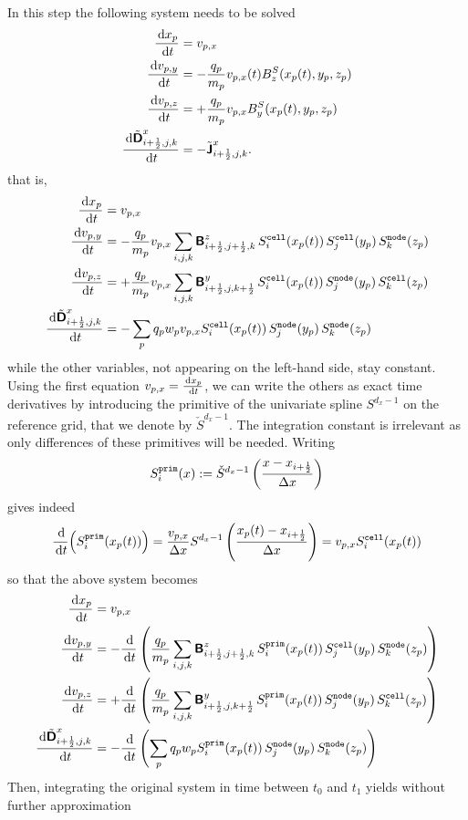 \documentclass[11pt]{article}
\newcommand{\cell}{\texttt{cell}}
\newcommand{\node}{\texttt{node}}
\newcommand{\prim}{\texttt{prim}}
\begin{document}
In this step the following system needs to be solved
$$
\begin{aligned}
    \fract{x_p}{t} &= v_{p,x} \\
    \fract{v_{p, y}}{t} &= - \frac{q_p}{m_p} v_{p,x}(t)B^S_z(x_p(t) ,y_p,z_p) \\
    \fract{v_{p, z}}{t} &= + \frac{q_p}{m_p} v_{p,x}B^S_y(x_p(t),y_p,z_p) \\
    \fract{\tilde{\arrD}^{x}_{\iph,j,k}}{t} &= -\tilde{\arrJ}^{x}_{\iph,j,k}. %
\end{aligned}
$$
that is,
$$
\begin{aligned}
    \fract{x_p}{t} &= v_{p,x} \\
    \fract{v_{p, y}}{t} &= -\frac{q_p}{m_p} v_{p,x} \sum_{i,j,k} \arrB^{z}_{\iph,\jph,k} \,S^\cell_i(x_p(t))\,S^\cell_j(y_p) \, S^\node_k(z_p)\\
    \fract{v_{p, z}}{t} &= +\frac{q_p}{m_p} v_{p,x} \sum_{i,j,k} \arrB^{y}_{\iph,j,\kph} \,S^\cell_i(x_p(t))\,S^\node_j(y_p) \, S^\cell_k(z_p) \\
    \fract{\tilde{\arrD}^{x}_{\iph,j,k}}{t} &= - \sum_p q_p w_p v_{p,x} S^\cell_i(x_p(t))\, S^\node_j(y_p) \,S^\node_k(z_p)    
\end{aligned}
$$
while the other variables, not appearing on the left-hand side, stay constant.
Using the first equation $v_{p,x}=\frac{\, {\rm d} x_p}{\, {\rm d} t}$, we can write the others as exact time derivatives 
by introducing the primitive of the univariate spline $S^{d_x-1}$ on the reference grid,
that we denote by $\check{S}^{d_x-1}$.
The integration constant is irrelevant as only differences of these primitives will be needed.
Writing
$$
S^\prim_i(x) := \check{S}^{d_x-1}\left(\frac{x-x_\iph}{\Delta x}\right)
$$
gives indeed
$$
\fract{}{t} \Big(S^\prim_i(x_p(t))\Big)
= \frac{v_{p,x}}{\Delta x} S^{d_x-1}\left(\frac{x_p(t)-x_\iph}{\Delta x}\right)
= v_{p,x} S^\cell_i(x_p(t))
$$ 
so that the above system becomes
$$
\begin{aligned}
    \fract{x_p}{t} &= v_{p,x} \\
    \fract{v_{p, y}}{t} &= -\fract{}{t} \left(\frac{q_p}{m_p} \sum_{i,j,k} \arrB^{z}_{\iph,\jph,k} \,S^\prim_i(x_p(t))\,S^\cell_j(y_p) \, S^\node_k(z_p)\right)\\
    \fract{v_{p, z}}{t} &= +\fract{}{t} \left(\frac{q_p}{m_p} \sum_{i,j,k} \arrB^{y}_{\iph,j,\kph} \,S^\prim_i(x_p(t))\,S^\node_j(y_p) \, S^\cell_k(z_p) \right)\\
    \fract{\tilde{\arrD}^{x}_{\iph,j,k}}{t} &= - \fract{}{t}\left(\sum_p q_p w_p S^\prim_i(x_p(t))\, S^\node_j(y_p) \,S^\node_k(z_p) \right)   
\end{aligned}
$$
Then, integrating the original system in time between $t_0$ and $t_1$ yields without further approximation
\end{document}
